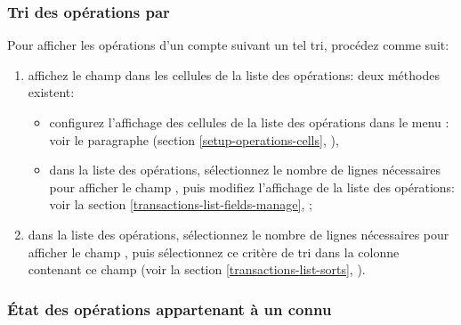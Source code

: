 \subsubsection{Tri des opérations par \label{reconciliation-manage-content-sort}}

Pour afficher les opérations d'un compte suivant un tel tri, procédez comme suit:
\begin{enumerate}
	\item affichez le champ  dans les cellules de la liste des opérations: deux méthodes existent:
		\begin{itemize}
			\item configurez l'affichage des cellules de la liste des opérations dans le menu : voir le paragraphe  (section \vref{setup-operations-cells}, ),
			\item dans la liste des opérations, sélectionnez le nombre de lignes nécessaires pour afficher le champ , puis modifiez l'affichage de la liste des opérations: voir la section \vref{transactions-list-fields-manage}, ;	 
		\end{itemize}			 	
	\item dans la liste des opérations, sélectionnez le nombre de lignes nécessaires pour afficher le champ , puis sélectionnez ce critère de tri dans la colonne contenant ce champ (voir la section \vref{transactions-list-sorts}, ).
\end{enumerate}


\subsubsection{État des opérations appartenant à un  connu\label{reconciliation-manage-content-report}}

